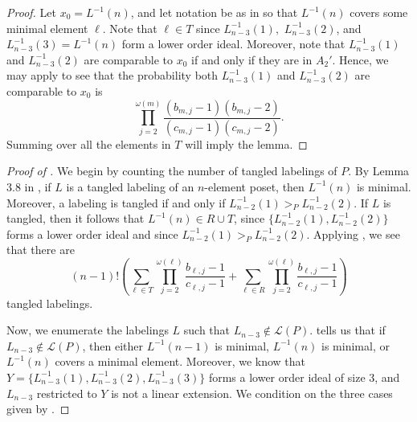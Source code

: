 \documentclass[11pt]{amsart}
\theoremstyle{definition}
\newcommand{\call}{\mathcal{L}}
\newcommand{\inverse}{^{-1}}
\begin{document}
\begin{proof}
	Let $ x_0=L\inverse(n) $, and let notation be as in  so that $ L\inverse(n) $ covers some minimal element $ \ell$. Note that $ \ell\in T $ since $ L_{n-3}\inverse(1), $ $ L_{n-3}\inverse(2) $, and $ L_{n-3}\inverse(3)=L\inverse(n) $ form a lower order ideal. Moreover, note that $ L_{n-3}\inverse(1) $ and $ L_{n-3}\inverse(2) $ are comparable to $ x_0 $ if and only if they are in $ A_2' $. Hence, we may apply  to see that the probability both $ L_{n-3}\inverse(1) $ and $ L_{n-3}\inverse(2) $ are comparable to $ x_0 $ is \[\prod_{j=2}^{\omega(m)}\frac{(b_{m,j}-1)(b_{m,j}-2)}{(c_{m,j}-1)(c_{m,j}-2)}.\] Summing over all the elements in $ T $ will imply the lemma. 
\end{proof}

\begin{proof}[Proof of ]
	We begin by counting the number of tangled labelings of $ P $. By Lemma 3.8 in \cite{DK20}, if $ L $ is a tangled labeling of an $ n $-element poset, then $ L\inverse(n) $ is minimal. Moreover, a labeling is tangled if and only if $ L_{n-2}\inverse(1)>_PL_{n-2}\inverse(2) $. If $ L $ is tangled, then it follows that $ L\inverse(n)\in R\cup T $, since $ \{L_{n-2}\inverse(1),L_{n-2}\inverse(2)\} $ forms a lower order ideal and since $ L_{n-2}\inverse(1)>_PL_{n-2}\inverse(2) $. Applying , we see that there are \begin{equation}\label{eq: tangled}
		(n-1)!\left(\sum_{\ell\in T}\prod_{j=2}^{\omega(\ell)}\frac{b_{\ell,j}-1}{c_{\ell,j}-1}+\sum_{\ell\in R}\prod_{j=2}^{\omega(\ell)}\frac{b_{\ell,j}-1}{c_{\ell,j}-1}\right)
	\end{equation} tangled labelings. 
	
	Now, we enumerate the labelings $ L $ such that $ L_{n-3}\not\in\call(P) $.  tells us that if $ L_{n-3}\not\in\call(P) $, then either $ L\inverse(n-1) $ is minimal, $ L\inverse(n) $ is minimal, or $ L\inverse(n) $ covers a minimal element. Moreover, we know that $ Y=\{L_{n-3}\inverse(1),L_{n-3}\inverse(2),L_{n-3}\inverse(3)\} $ forms a lower order ideal of size 3, and $ L_{n-3} $ restricted to $ Y $ is not a linear extension. We condition on the three cases given by .
	

\end{proof}
\end{document}
